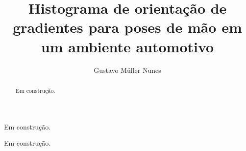 \documentclass[rascunho]{fei}
\author{Gustavo Müller Nunes}
\title{Histograma de orientação de gradientes para poses de mão em um ambiente automotivo}
\begin{document}
	\maketitle
	
	
	
	
	\begin{agradecimentos}
		Em construção.
	\end{agradecimentos}
	
	
	\begin{resumo}
		Em construção.
	\end{resumo}
	
	\begin{abstract}
		Em construção.
	\end{abstract}
	
	\tableofcontents 	%
	\listoffigures 		%
	\listoftables 		%
	\printglossaries	%
	
	
	
	
	
	
\end{document}
